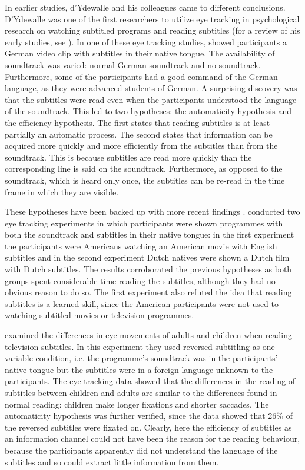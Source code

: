 \documentclass[output=paper]{langsci/langscibook}
\begin{document}
\largerpage
In earlier studies, d'Ydewalle and his colleagues came to different conclusions. D'Ydewalle was one of the first researchers to utilize eye tracking in psychological research on watching subtitled programs and reading subtitles (for a review of his early studies, see \citealt{dydewalle1992}). In one of these eye tracking studies, \citet{dydewalle1987} showed participants a German video clip with subtitles in their native tongue. The availability of soundtrack was varied: normal German soundtrack and no soundtrack. Furthermore, some of the participants had a good command of the German language, as they were advanced students of German. A surprising discovery was that the subtitles were read even when the participants understood the language of the soundtrack. This led to two hypotheses: the automaticity hypothesis and the efficiency hypothesis. The first states that reading subtitles is at least partially an automatic process. The second states that information can be acquired more quickly and more efficiently from the subtitles than from the soundtrack. This is because subtitles are read more quickly than the corresponding line is said on the soundtrack. Furthermore, as opposed to the soundtrack, which is heard only once, the subtitles can be re-read in the time frame in which they are visible. 


These hypotheses have been backed up with more recent findings \citep{dydewalle1991, Bruycker2007, Perego2010, Perego2015}.  conducted two eye tracking experiments in which participants were shown programmes with both the soundtrack and subtitles in their native tongue: in the first experiment the participants were Americans watching an American movie with English subtitles and in the second experiment Dutch natives were shown a Dutch film with Dutch subtitles. The results corroborated the previous hypotheses as both groups spent considerable time reading the subtitles, although they had no obvious reason to do so. The first experiment also refuted the idea that reading subtitles is a learned skill, since the American participants were not used to watching subtitled movies or television programmes.

 examined the differences in eye movements of adults and children when reading television subtitles. In this experiment they used reversed subtitling as one variable condition, i.e. the programme's soundtrack was in the participants' native tongue but the subtitles were in a foreign language unknown to the participants. The eye tracking data showed that the differences in the reading of subtitles between children and adults are similar to the differences found in normal reading: children make longer fixations and shorter saccades. The automaticity hypothesis was further verified, since the data showed that 26\% of the reversed subtitles were fixated on. Clearly, here the efficiency of subtitles as an information channel could not have been the reason for the reading behaviour, because the participants apparently did not understand the language of the subtitles and so could extract little information from them. 
\end{document}
